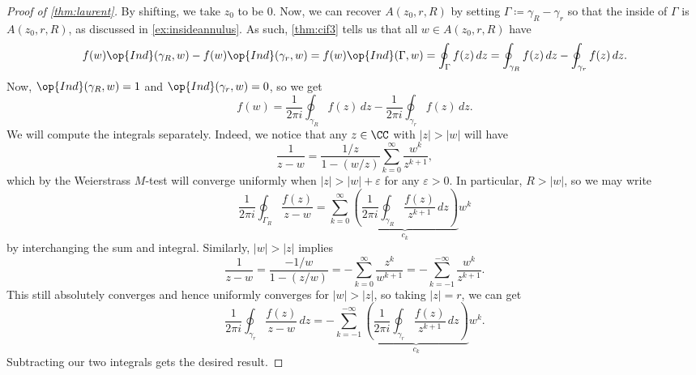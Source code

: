 \begin{proof}[Proof of \autoref{thm:laurent}]
	By shifting, we take $z_0$ to be $0$. Now, we can recover $A(z_0,r,R)$ by setting $\Gamma\coloneqq\gamma_R-\gamma_r$ so that the inside of $\Gamma$ is $A(z_0,r,R)$, as discussed in \autoref{ex:insideannulus}. As such, \autoref{thm:cif3} tells us that all $w\in A(z_0,r,R)$ have
	\[f(w)\op{Ind}(\gamma_R,w)-f(w)\op{Ind}(\gamma_r,w)=f(w)\op{Ind}(\Gamma,w)=\oint_\Gamma f(z)\,dz=\oint_{\gamma_R}f(z)\,dz-\oint_{\gamma_r}f(z)\,dz.\]
	Now, $\op{Ind}(\gamma_R,w)=1$ and $\op{Ind}(\gamma_r,w)=0$, so we get
	\[f(w)=\frac1{2\pi i}\oint_{\gamma_R}f(z)\,dz-\frac1{2\pi i}\oint_{\gamma_r}f(z)\,dz.\]
	We will compute the integrals separately. Indeed, we notice that any $z\in\CC$ with $|z|>|w|$ will have
	\[\frac1{z-w}=\frac{1/z}{1-(w/z)}\sum_{k=0}^\infty\frac{w^k}{z^{k+1}},\]
	which by the Weierstrass $M$-test will converge uniformly when $|z|>|w|+\varepsilon$ for any $\varepsilon>0$. In particular, $R>|w|$, so we may write
	\[\frac1{2\pi i}\oint_{\Gamma_R}\frac{f(z)}{z-w}=\sum_{k=0}^\infty\underbrace{\left(\frac1{2\pi i}\oint_{\gamma_R}\frac{f(z)}{z^{k+1}}\,dz\right)}_{c_k}w^k\]
	by interchanging the sum and integral. Similarly, $|w|>|z|$ implies
	\[\frac1{z-w}=\frac{-1/w}{1-(z/w)}=-\sum_{k=0}^\infty\frac{z^k}{w^{k+1}}=-\sum_{k=-1}^{-\infty}\frac{w^k}{z^{k+1}}.\]
	This still absolutely converges and hence uniformly converges for $|w|>|z|$, so taking $|z|=r$, we can get
	\[\frac1{2\pi i}\oint_{\gamma_r}\frac{f(z)}{z-w}\,dz=-\sum_{k=-1}^{-\infty}\underbrace{\left(\frac1{2\pi i}\oint_{\gamma_r}\frac{f(z)}{z^{k+1}}\,dz\right)}_{c_k}w^k.\]
	Subtracting our two integrals gets the desired result.
\end{proof}